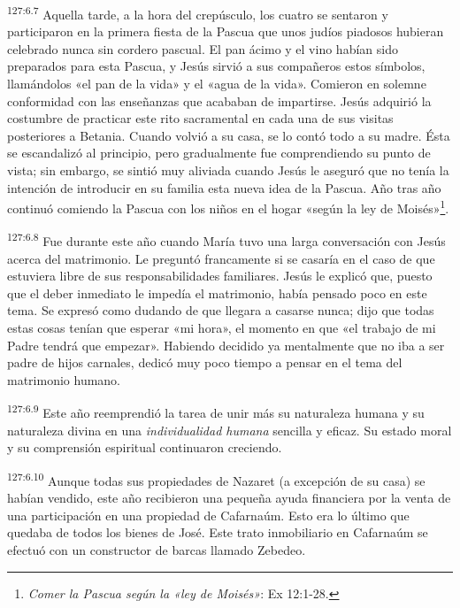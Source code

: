 \par
\textsuperscript{127:6.7} Aquella tarde, a la hora del crepúsculo, los cuatro se sentaron y participaron en la primera fiesta de la Pascua que unos judíos piadosos hubieran celebrado nunca sin cordero pascual. El pan ácimo y el vino habían sido preparados para esta Pascua, y Jesús sirvió a sus compañeros estos símbolos, llamándolos «el pan de la vida» y el «agua de la vida». Comieron en solemne conformidad con las enseñanzas que acababan de impartirse. Jesús adquirió la costumbre de practicar este rito sacramental en cada una de sus visitas posteriores a Betania. Cuando volvió a su casa, se lo contó todo a su madre. Ésta se escandalizó al principio, pero gradualmente fue comprendiendo su punto de vista; sin embargo, se sintió muy aliviada cuando Jesús le aseguró que no tenía la intención de introducir en su familia esta nueva idea de la Pascua. Año tras año continuó comiendo la Pascua con los niños en el hogar «según la ley de Moisés»\footnote{\textit{Comer la Pascua según la «ley de Moisés»}: Ex 12:1-28.}.

\par
\textsuperscript{127:6.8} Fue durante este año cuando María tuvo una larga conversación con Jesús acerca del matrimonio. Le preguntó francamente si se casaría en el caso de que estuviera libre de sus responsabilidades familiares. Jesús le explicó que, puesto que el deber inmediato le impedía el matrimonio, había pensado poco en este tema. Se expresó como dudando de que llegara a casarse nunca; dijo que todas estas cosas tenían que esperar «mi hora», el momento en que «el trabajo de mi Padre tendrá que empezar». Habiendo decidido ya mentalmente que no iba a ser padre de hijos carnales, dedicó muy poco tiempo a pensar en el tema del matrimonio humano.

\par
\textsuperscript{127:6.9} Este año reemprendió la tarea de unir más su naturaleza humana y su naturaleza divina en una \textit{individualidad humana} sencilla y eficaz. Su estado moral y su comprensión espiritual continuaron creciendo.

\par
\textsuperscript{127:6.10} Aunque todas sus propiedades de Nazaret (a excepción de su casa) se habían vendido, este año recibieron una pequeña ayuda financiera por la venta de una participación en una propiedad de Cafarnaúm. Esto era lo último que quedaba de todos los bienes de José. Este trato inmobiliario en Cafarnaúm se efectuó con un constructor de barcas llamado Zebedeo.

